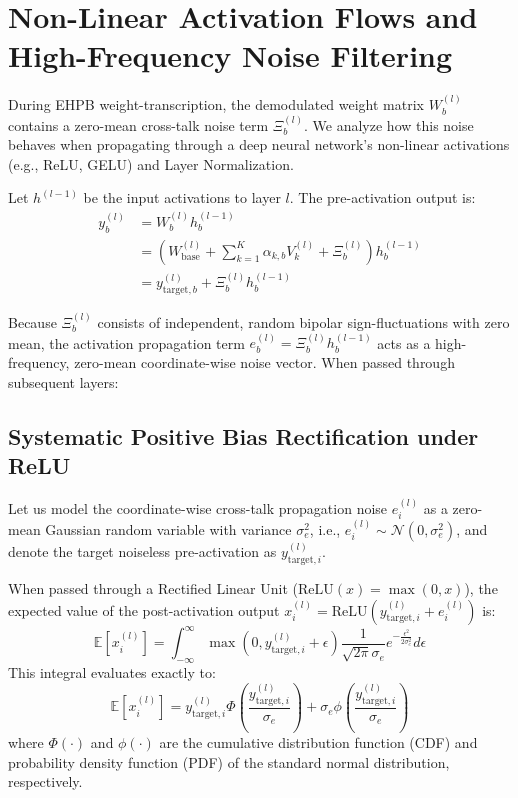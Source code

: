\documentclass{article}
\theoremstyle{plain}
\theoremstyle{definition}
\theoremstyle{remark}
\begin{document}
\section{Non-Linear Activation Flows and High-Frequency Noise Filtering}
\label{app:nonlinear_activations}

During EHPB weight-transcription, the demodulated weight matrix $W_b^{(l)}$ contains a zero-mean cross-talk noise term $\Xi_b^{(l)}$. We analyze how this noise behaves when propagating through a deep neural network's non-linear activations (e.g., ReLU, GELU) and Layer Normalization.

Let $h^{(l-1)}$ be the input activations to layer $l$. The pre-activation output is:
\begin{align}
y_b^{(l)} &= W_b^{(l)} h_b^{(l-1)} \\
&= \left( W_{\text{base}}^{(l)} + \sum_{k=1}^K \alpha_{k, b} V_k^{(l)} + \Xi_b^{(l)} \right) h_b^{(l-1)} \\
&= y_{\text{target}, b}^{(l)} + \Xi_b^{(l)} h_b^{(l-1)}
\end{align}

Because $\Xi_b^{(l)}$ consists of independent, random bipolar sign-fluctuations with zero mean, the activation propagation term $e_b^{(l)} = \Xi_b^{(l)} h_b^{(l-1)}$ acts as a high-frequency, zero-mean coordinate-wise noise vector. When passed through subsequent layers:

\subsection{Systematic Positive Bias Rectification under ReLU}
Let us model the coordinate-wise cross-talk propagation noise $e_i^{(l)}$ as a zero-mean Gaussian random variable with variance $\sigma_e^2$, i.e., $e_i^{(l)} \sim \mathcal{N}(0, \sigma_e^2)$, and denote the target noiseless pre-activation as $y_{\text{target}, i}^{(l)}$.

When passed through a Rectified Linear Unit ($\text{ReLU}(x) = \max(0, x)$), the expected value of the post-activation output $x_i^{(l)} = \text{ReLU}\left( y_{\text{target}, i}^{(l)} + e_i^{(l)} \right)$ is:
\begin{equation}
\mathbb{E}[x_i^{(l)}] = \int_{-\infty}^{\infty} \max\left(0, y_{\text{target}, i}^{(l)} + \epsilon\right) \frac{1}{\sqrt{2\pi}\sigma_e} e^{-\frac{\epsilon^2}{2\sigma_e^2}} d\epsilon
\end{equation}
This integral evaluates exactly to:
\begin{equation}
\mathbb{E}[x_i^{(l)}] = y_{\text{target}, i}^{(l)} \Phi\left( \frac{y_{\text{target}, i}^{(l)}}{\sigma_e} \right) + \sigma_e \phi\left( \frac{y_{\text{target}, i}^{(l)}}{\sigma_e} \right)
\end{equation}
where $\Phi(\cdot)$ and $\phi(\cdot)$ are the cumulative distribution function (CDF) and probability density function (PDF) of the standard normal distribution, respectively.
\end{document}

